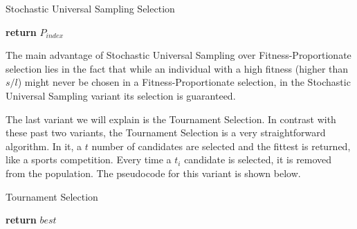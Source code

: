 \begin{algorithm}[H]
    \caption{Stochastic Universal Sampling Selection}
    \begin{algorithmic}[1]
             
             
            \EndIf
             
            \EndFor
        \EndProcedure
            \EndWhile
            \State \textbf{return} $P_{index}$
        \EndProcedure
    \end{algorithmic}
\end{algorithm}

The main advantage of Stochastic Universal Sampling over Fitness-Proportionate selection lies in the fact that while an individual with a high fitness (higher than $s/l$) might never be chosen in a Fitness-Proportionate selection, in the Stochastic Universal Sampling variant its selection is guaranteed.

The last variant we will explain is the Tournament Selection. In contrast with these past two variants, the Tournament Selection is a very straightforward algorithm. In it, a $t$ number of candidates are selected and the fittest is returned, like a sports competition. Every time a $t_{i}$ candidate is selected, it is removed from the population. The pseudocode for this variant is shown below. 

\begin{algorithm}[H]
    \caption{Tournament Selection}
    \label{theory-ga-ts}
    \begin{algorithmic}[1]
                \EndIf
            \EndFor
            \State \textbf{return} $best$
        \EndProcedure
    \end{algorithmic}
\end{algorithm}

